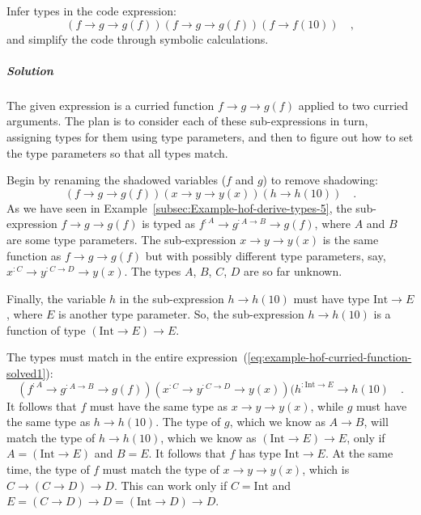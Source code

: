 Infer types in the code expression:
\[
\left(f\rightarrow g\rightarrow g(f)\right)\left(f\rightarrow g\rightarrow g(f)\right)\left(f\rightarrow f(10)\right)\quad,
\]
and simplify the code through symbolic calculations.

\subparagraph{Solution}

The given expression is a curried function $f\rightarrow g\rightarrow g(f)$
applied to two curried arguments. The plan is to consider each of
these sub-expressions in turn, assigning types for them using type
parameters, and then to figure out how to set the type parameters
so that all types match.

Begin by renaming the shadowed variables ($f$ and $g$) to remove
shadowing:
\begin{equation}
\left(f\rightarrow g\rightarrow g(f)\right)\left(x\rightarrow y\rightarrow y(x)\right)\left(h\rightarrow h(10)\right)\quad.\label{eq:example-hof-curried-function-solved1}
\end{equation}
 As we have seen in Example~\ref{subsec:Example-hof-derive-types-5},
the sub-expression $f\rightarrow g\rightarrow g(f)$ is typed as $f^{:A}\rightarrow g^{:A\rightarrow B}\rightarrow g(f)$,
where $A$ and $B$ are some type parameters. The sub-expression $x\rightarrow y\rightarrow y(x)$
is the same function as $f\rightarrow g\rightarrow g(f)$ but with
possibly different type parameters, say, $x^{:C}\rightarrow y^{:C\rightarrow D}\rightarrow y(x)$.
The types $A$, $B$, $C$, $D$ are so far unknown.

Finally, the variable $h$ in the sub-expression $h\rightarrow h(10)$
must have type $\text{Int}\rightarrow E$, where $E$ is another type
parameter. So, the sub-expression $h\rightarrow h(10)$ is a function
of type $\left(\text{Int}\rightarrow E\right)\rightarrow E$.

The types must match in the entire expression~(\ref{eq:example-hof-curried-function-solved1}):
\begin{equation}
(f^{:A}\rightarrow g^{:A\rightarrow B}\rightarrow g(f))(x^{:C}\rightarrow y^{:C\rightarrow D}\rightarrow y(x))(h^{:\text{Int}\rightarrow E}\rightarrow h(10)\quad.\label{eq:example-hof-curried-function-solved2}
\end{equation}
It follows that $f$ must have the same type as $x\rightarrow y\rightarrow y(x)$,
while $g$ must have the same type as $h\rightarrow h(10)$. The type
of $g$, which we know as $A\rightarrow B$, will match the type of
$h\rightarrow h(10)$, which we know as $\left(\text{Int}\rightarrow E\right)\rightarrow E$,
only if $A=\left(\text{Int}\rightarrow E\right)$ and $B=E$. It follows
that $f$ has type $\text{Int}\rightarrow E$. At the same time, the
type of $f$ must match the type of $x\rightarrow y\rightarrow y(x)$,
which is $C\rightarrow(C\rightarrow D)\rightarrow D$. This can work
only if $C=\text{Int}$ and $E=(C\rightarrow D)\rightarrow D=(\text{Int}\rightarrow D)\rightarrow D$.

